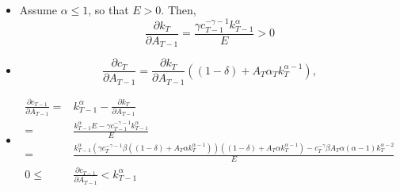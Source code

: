 \documentclass[compress]{beamer}
\begin{document}
\begin{frame}
  \begin{itemize}
  \item Assume $\alpha \leq 1$, so 
    that $E > 0$. Then,
    \[ 
    \frac{\partial k_T}{\partial A_{T-1}} = \frac{\gamma
      c_{T-1}^{-\gamma-1} k_{T-1}^\alpha} {E} > 0 \]
  \item 
    \[ \frac{\partial c_T}{\partial A_{T-1}} = \frac{\partial
      k_T}{\partial A_{T-1}}  \left((1-\delta) + A_T \alpha _T
      k_T^{\alpha-1} \right), \]
  \item 
    \begin{align*}
      \frac{\partial c_{T-1}}{\partial A_{T-1}} = & k_{T-1}^\alpha -
      \frac{\partial k_T}{\partial A_{T-1}} \\
      = & \frac{k_{T-1}^\alpha E - \gamma c_{T-1}^{-\gamma-1}
        k_{T-1}^\alpha } {E} \\
      = & \frac{k_{T-1}^\alpha \left(\gamma c_{T}^{-\gamma-1}
          \beta\left((1-\delta) + A_T 
            \alpha k_T^{\alpha-1}\right)\right)
        \left((1-\delta) + A_T\alpha k_T^{\alpha-1} \right) - c_T^{-\gamma}
        \beta A_T \alpha (\alpha-1) k_T^{\alpha-2} } {E} \\
      0  \leq & \frac{\partial c_{T-1}}{\partial A_{T-1}} <  k_{T-1}^\alpha 
    \end{align*}
  \end{itemize}
\end{frame}
\end{document}
